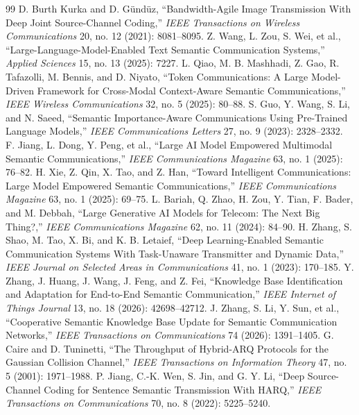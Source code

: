 \begin{thebibliography}{99}
 D. Burth Kurka and D. G\"und\"uz, ``Bandwidth-Agile Image Transmission With Deep Joint Source-Channel Coding,'' \textit{IEEE Transactions on Wireless Communications} 20, no. 12 (2021): 8081--8095.
 Z. Wang, L. Zou, S. Wei, et al., ``Large-Language-Model-Enabled Text Semantic Communication Systems,'' \textit{Applied Sciences} 15, no. 13 (2025): 7227.
 L. Qiao, M. B. Mashhadi, Z. Gao, R. Tafazolli, M. Bennis, and D. Niyato, ``Token Communications: A Large Model-Driven Framework for Cross-Modal Context-Aware Semantic Communications,'' \textit{IEEE Wireless Communications} 32, no. 5 (2025): 80--88.
 S. Guo, Y. Wang, S. Li, and N. Saeed, ``Semantic Importance-Aware Communications Using Pre-Trained Language Models,'' \textit{IEEE Communications Letters} 27, no. 9 (2023): 2328--2332.
 F. Jiang, L. Dong, Y. Peng, et al., ``Large AI Model Empowered Multimodal Semantic Communications,'' \textit{IEEE Communications Magazine} 63, no. 1 (2025): 76--82.
 H. Xie, Z. Qin, X. Tao, and Z. Han, ``Toward Intelligent Communications: Large Model Empowered Semantic Communications,'' \textit{IEEE Communications Magazine} 63, no. 1 (2025): 69--75.
 L. Bariah, Q. Zhao, H. Zou, Y. Tian, F. Bader, and M. Debbah, ``Large Generative AI Models for Telecom: The Next Big Thing?,'' \textit{IEEE Communications Magazine} 62, no. 11 (2024): 84--90.
 H. Zhang, S. Shao, M. Tao, X. Bi, and K. B. Letaief, ``Deep Learning-Enabled Semantic Communication Systems With Task-Unaware Transmitter and Dynamic Data,'' \textit{IEEE Journal on Selected Areas in Communications} 41, no. 1 (2023): 170--185.
 Y. Zhang, J. Huang, J. Wang, J. Feng, and Z. Fei, ``Knowledge Base Identification and Adaptation for End-to-End Semantic Communication,'' \textit{IEEE Internet of Things Journal} 13, no. 18 (2026): 42698--42712.
 J. Zhang, S. Li, Y. Sun, et al., ``Cooperative Semantic Knowledge Base Update for Semantic Communication Networks,'' \textit{IEEE Transactions on Communications} 74 (2026): 1391--1405.
 G. Caire and D. Tuninetti, ``The Throughput of Hybrid-ARQ Protocols for the Gaussian Collision Channel,'' \textit{IEEE Transactions on Information Theory} 47, no. 5 (2001): 1971--1988.
 P. Jiang, C.-K. Wen, S. Jin, and G. Y. Li, ``Deep Source-Channel Coding for Sentence Semantic Transmission With HARQ,'' \textit{IEEE Transactions on Communications} 70, no. 8 (2022): 5225--5240.

\end{thebibliography}
